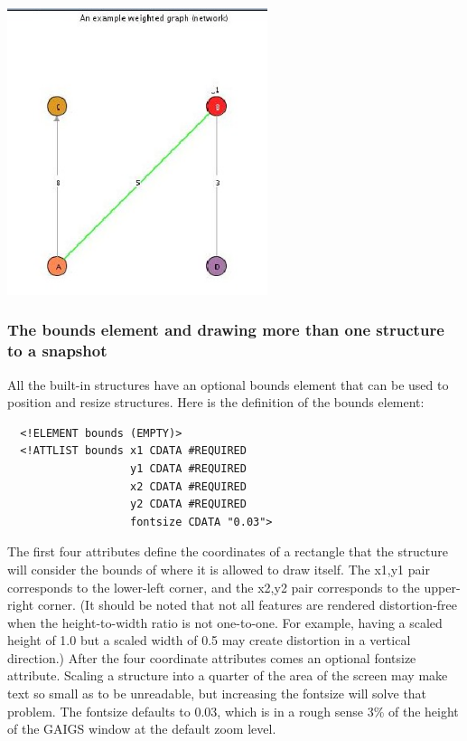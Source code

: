 \documentclass[12pt]{article}
\begin{document}
\begin{center}
  \includegraphics[width=3in]{howto_graphics/graph.eps}
\end{center}


\subsubsection{The bounds element and drawing more than one structure to a snapshot}


All the built-in structures have an optional bounds element that can
be used to position and resize structures. Here is the definition of
the bounds element:

\footnotesize \begin{verbatim}
  <!ELEMENT bounds (EMPTY)>
  <!ATTLIST bounds x1 CDATA #REQUIRED
                   y1 CDATA #REQUIRED
                   x2 CDATA #REQUIRED
                   y2 CDATA #REQUIRED
                   fontsize CDATA "0.03">
\end{verbatim} \normalsize
  
  The first four attributes define the coordinates of a rectangle that
  the structure will consider the bounds of where it is allowed to
  draw itself. The x1,y1 pair corresponds to the lower-left corner,
  and the x2,y2 pair corresponds to the upper-right corner. (It should
  be noted that not all features are rendered distortion-free when the
  height-to-width ratio is not one-to-one. For example, having a
  scaled height of 1.0 but a scaled width of 0.5 may create distortion
  in a vertical direction.) After the four coordinate attributes comes
  an optional fontsize attribute. Scaling a structure into a quarter
  of the area of the screen may make text so small as to be unreadable, but
  increasing the fontsize will solve that problem. The fontsize
  defaults to 0.03, which is in a rough sense 3\% of the height of the
  GAIGS window at the default zoom level.
\end{document}
